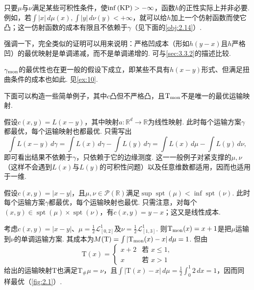 \begin{remark}\label{obj:2.11}
只要$\mu$与$\nu$满足某些可积性条件，使$\inf\textup{(KP)}> -\infty$，函数$h$的正性实际上并非必要. 例如，若$\int|x|\,d\mu(x),\int|y|\,d\nu(y)<+\infty$，就可以给$h$加上一个仿射函数而使它凸；这一仿射函数的成本有限且不依赖于$\gamma$（见下面的\autoref{obj:2.14}）.
\end{remark}

\begin{remark}\label{obj:2.12}
强调一下，完全类似的证明可以用来说明：严格凹成本（形如$h(y-x)$且$h$严格凹）的最优映射是单调递减，而不是单调递增的. 可与\autoref{sec:3.3.2}的描述比较.
\end{remark}

\begin{remark}\label{obj:2.13}
$\gamma_{\rm mon}$的最优性也在更一般的假设下成立，即某些不具有$h(x-y)$形式、但满足扭曲条件的成本也如此. 见\autoref{ex:10}.
\end{remark}

下面可以构造一些简单例子，其中$c$凸但不严格凸，且$\mathrm T_{\rm mon}$不是唯一的最优运输映射.

\begin{example}[线性成本]\label{obj:2.14}
假设$c(x,y)=L(x-y)$，其中映射$a:\mathbb R^d\to\mathbb R$为线性映射. 此时每个运输方案$\gamma$都最优，每个运输映射也都最优. 只需写出
\[
\int L(x-y)\,d\gamma
=\int L(x)\,d\gamma-\int L(y)\,d\gamma
=\int L(x)\,d\mu-\int L(y)\,d\nu,
\]
即可看出结果不依赖于$\gamma$，只依赖于它的边缘测度. 这一一般例子对紧支撑的$\mu,\nu$（这样不会遇到$L(x)$与$L(y)$的可积性问题）以及任意维数都适用，因而也适用于一维.
\end{example}

\begin{example}[直线上的距离成本]\label{obj:2.15}
假设$c(x,y)=|x-y|$，且$\mu,\nu\in\mathscr P(\mathbb R)$满足$\sup\operatorname{spt}(\mu)<\inf\operatorname{spt}(\nu)$. 此时每个运输方案$\gamma$都最优，每个运输映射也最优. 只需注意，对每个$(x,y)\in\operatorname{spt}(\mu)\times\operatorname{spt}(\nu)$，有$c(x,y)=y-x$；这又是线性成本.
\end{example}

\begin{example}[移动书籍]\label{obj:2.16}
考虑$c(x,y)=|x-y|$、$\mu=\frac12\mathscr L^1_{[0,2]}$及$\nu=\frac12\mathscr L^1_{[1,3]}$. 则$\mathrm T_{\rm mon}(x)=x+1$是把$\mu$运输到$\nu$的单调运输方案. 其成本为$M(\mathrm T)=\int|\mathrm T_{\rm mon}(x)-x|\,d\mu=1$. 但由
\[
\mathrm T(x)=\begin{cases}x+2&\text{若 }x\le1,\\x&\text{若 }x>1\end{cases}
\]
给出的运输映射$\mathrm T$也满足$\mathrm T_\#\mu=\nu$，且$\int|\mathrm T(x)-x|\,d\mu=\frac12\int_0^1 2\,dx=1$，因而同样最优（\autoref{fig:2.1}）.
\end{example}

